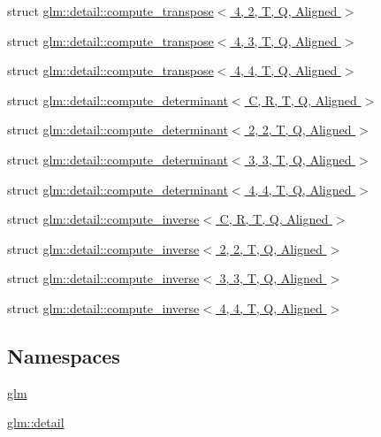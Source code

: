 \begin{DoxyCompactItemize}
struct \hyperlink{structglm_1_1detail_1_1compute__transpose_3_014_00_012_00_01_t_00_01_q_00_01_aligned_01_4}{glm\+::detail\+::compute\+\_\+transpose$<$ 4, 2, T, Q, Aligned $>$}
\item 
struct \hyperlink{structglm_1_1detail_1_1compute__transpose_3_014_00_013_00_01_t_00_01_q_00_01_aligned_01_4}{glm\+::detail\+::compute\+\_\+transpose$<$ 4, 3, T, Q, Aligned $>$}
\item 
struct \hyperlink{structglm_1_1detail_1_1compute__transpose_3_014_00_014_00_01_t_00_01_q_00_01_aligned_01_4}{glm\+::detail\+::compute\+\_\+transpose$<$ 4, 4, T, Q, Aligned $>$}
\item 
struct \hyperlink{structglm_1_1detail_1_1compute__determinant}{glm\+::detail\+::compute\+\_\+determinant$<$ C, R, T, Q, Aligned $>$}
\item 
struct \hyperlink{structglm_1_1detail_1_1compute__determinant_3_012_00_012_00_01_t_00_01_q_00_01_aligned_01_4}{glm\+::detail\+::compute\+\_\+determinant$<$ 2, 2, T, Q, Aligned $>$}
\item 
struct \hyperlink{structglm_1_1detail_1_1compute__determinant_3_013_00_013_00_01_t_00_01_q_00_01_aligned_01_4}{glm\+::detail\+::compute\+\_\+determinant$<$ 3, 3, T, Q, Aligned $>$}
\item 
struct \hyperlink{structglm_1_1detail_1_1compute__determinant_3_014_00_014_00_01_t_00_01_q_00_01_aligned_01_4}{glm\+::detail\+::compute\+\_\+determinant$<$ 4, 4, T, Q, Aligned $>$}
\item 
struct \hyperlink{structglm_1_1detail_1_1compute__inverse}{glm\+::detail\+::compute\+\_\+inverse$<$ C, R, T, Q, Aligned $>$}
\item 
struct \hyperlink{structglm_1_1detail_1_1compute__inverse_3_012_00_012_00_01_t_00_01_q_00_01_aligned_01_4}{glm\+::detail\+::compute\+\_\+inverse$<$ 2, 2, T, Q, Aligned $>$}
\item 
struct \hyperlink{structglm_1_1detail_1_1compute__inverse_3_013_00_013_00_01_t_00_01_q_00_01_aligned_01_4}{glm\+::detail\+::compute\+\_\+inverse$<$ 3, 3, T, Q, Aligned $>$}
\item 
struct \hyperlink{structglm_1_1detail_1_1compute__inverse_3_014_00_014_00_01_t_00_01_q_00_01_aligned_01_4}{glm\+::detail\+::compute\+\_\+inverse$<$ 4, 4, T, Q, Aligned $>$}
\end{DoxyCompactItemize}
\subsection*{Namespaces}
\begin{DoxyCompactItemize}
\item 
 \hyperlink{namespaceglm}{glm}
\item 
 \hyperlink{namespaceglm_1_1detail}{glm\+::detail}
\end{DoxyCompactItemize}

